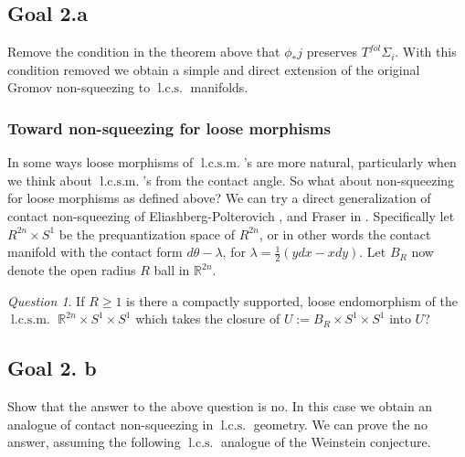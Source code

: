 \documentclass{amsart}
\numberwithin{equation}{section}
\theoremstyle{definition}
\theoremstyle{remark}
\newtheorem{question}{Question}
\DeclareMathOperator {\energy} {energy}
\DeclareMathOperator{\lcs}{l.c.s.}
\DeclareMathOperator{\lcsm}{l.c.s.m.}
\begin{document}
\subsection {Goal 2.a
}  Remove the condition in the theorem above that $\phi _{*}j $ preserves $T ^{fol} \Sigma _{i} $. With this condition removed we obtain a simple and direct extension of the original Gromov non-squeezing to $\lcs$ manifolds.
\subsubsection {Toward non-squeezing for loose morphisms} In some ways loose morphisms of $\lcsm$'s are more natural, particularly when we think about $\lcsm$'s from the contact angle.
So what about non-squeezing for loose morphisms as defined above? We can try a direct generalization of contact non-squeezing of Eliashberg-Polterovich \cite{citeEKPcontactnonsqueezing}, and Fraser in \cite{citeFraserNonsqueezing}.
Specifically let $R ^{2n}   \times S ^{1}  $ be the prequantization space of $R ^{2n} $, or in other words the contact manifold with the contact form $d\theta - \lambda$, for $\lambda = \frac{1}{2}(ydx - xdy)$. Let $B _{R} $ now denote the open radius $R$ ball in $\mathbb{R} ^{2n} $. 
\begin{question} \label{question:loose} If $R\geq 1$ is there a compactly supported, loose endomorphism of the $\lcsm$ $\mathbb{R} ^{2n} \times S ^{1} \times S ^{1}  $ which takes the closure of $U := B _{R} \times S ^{1} \times S ^{1}  $ into $U$? 
\end{question}
\subsection {Goal 2.
b} Show that the answer to the above question is no. In this case we obtain an analogue of contact non-squeezing in $\lcs$ geometry.
We can prove the no answer, assuming the following $\lcs$ analogue of the Weinstein conjecture.
\end{document}
